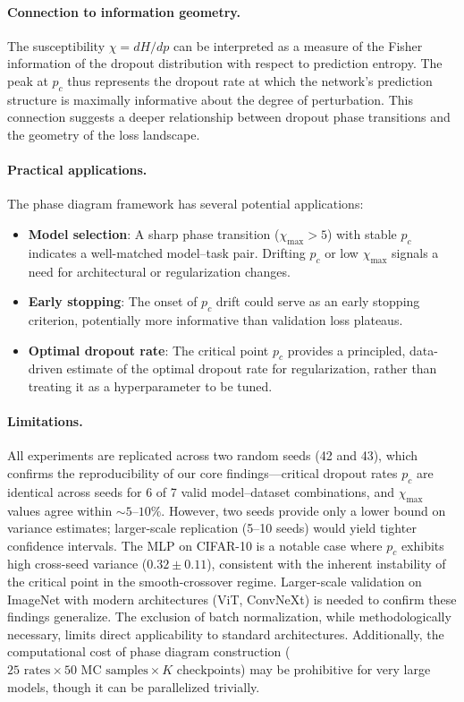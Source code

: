 \documentclass{article}
\begin{document}
\paragraph{Connection to information geometry.}
The susceptibility $\chi = dH/dp$ can be interpreted as a measure of the Fisher information of the dropout distribution with respect to prediction entropy. The peak at $p_c$ thus represents the dropout rate at which the network's prediction structure is maximally informative about the degree of perturbation. This connection suggests a deeper relationship between dropout phase transitions and the geometry of the loss landscape.

\paragraph{Practical applications.}
The phase diagram framework has several potential applications:
\begin{itemize}
    \item \textbf{Model selection}: A sharp phase transition ($\chi_{\max} > 5$) with stable $p_c$ indicates a well-matched model--task pair. Drifting $p_c$ or low $\chi_{\max}$ signals a need for architectural or regularization changes.
    \item \textbf{Early stopping}: The onset of $p_c$ drift could serve as an early stopping criterion, potentially more informative than validation loss plateaus.
    \item \textbf{Optimal dropout rate}: The critical point $p_c$ provides a principled, data-driven estimate of the optimal dropout rate for regularization, rather than treating it as a hyperparameter to be tuned.
\end{itemize}

\paragraph{Limitations.}
All experiments are replicated across two random seeds (42 and 43), which confirms the reproducibility of our core findings---critical dropout rates $p_c$ are identical across seeds for 6 of 7 valid model--dataset combinations, and $\chi_{\max}$ values agree within ${\sim}5$--$10\%$. However, two seeds provide only a lower bound on variance estimates; larger-scale replication (5--10 seeds) would yield tighter confidence intervals. The MLP on CIFAR-10 is a notable case where $p_c$ exhibits high cross-seed variance ($0.32 \pm 0.11$), consistent with the inherent instability of the critical point in the smooth-crossover regime. Larger-scale validation on ImageNet with modern architectures (ViT, ConvNeXt) is needed to confirm these findings generalize. The exclusion of batch normalization, while methodologically necessary, limits direct applicability to standard architectures. Additionally, the computational cost of phase diagram construction ($25 \text{ rates} \times 50 \text{ MC samples} \times K \text{ checkpoints}$) may be prohibitive for very large models, though it can be parallelized trivially.
\end{document}
